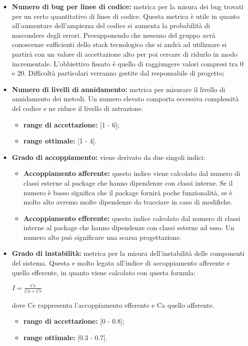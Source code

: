 \begin{itemize}
				\item \textbf{Numero di bug per linee di codice:} metrica per la misura dei bug trovati per un certo quantitativo di linee di codice. Questa metrica è utile in quanto all'aumentare dell'ampiezza del codice si aumenta la probabilità di nascondere degli errori. Presupponendo che nessuno del gruppo avrà conoscenze sufficienti dello stack tecnologico che si andrà ad utilizzare si partirà con un valore di accettazione alto per poi cercare di ridurlo in modo incrementale. L'obbiettivo fissato è quello di raggiungere valori compresi tra 0 e 20. Difficoltà particolari verranno gestite dal responsabile di progetto;
				\item \textbf{Numero di livelli di annidamento:} metrica per misurare il livello di annidamento dei metodi. Un numero elevato comporta eccessiva complessità del codice e ne riduce il livello di astrazione.
				\begin{itemize}
					\item \textbf{range di accettazione:} [1 - 6];
					\item \textbf{range ottimale:} [1 - 4].
				\end{itemize}
				
				\item \textbf{Grado di accoppiamento:} viene derivato da due singoli indici:
				\begin{itemize}
					\item \textbf{Accoppiamento afferente:} questo indice viene calcolato dal numero di classi esterne al package che hanno dipendenze con classi interne. Se il numero è basso significa che il package fornirà poche funzionalità, se è molto alto avremo molte dipendenze da tracciare in caso di modifiche.
					\item \textbf{Accoppiamento efferente:} questo indice calcolato dal numero di classi interne al package che hanno dipendenze con classi esterne ad esso. Un numero alto può significare una scarsa progettazione.
				\end{itemize}
				
				\item \textbf{Grado di instabilità:} metrica per la misura dell'instabilità delle componenti del sistema. Questa e molto legata all'indice di accoppiamento afferente e quello efferente, in quanto viene calcolato con questa formula:\\
				\begin{center}
					\begin{math}
						I=\frac{Ce}{Ca+Ce}
					\end{math}
				\end{center}		
				dove Ce rappresenta l'accoppiamento efferente e Ca quello afferente.
				\begin{itemize}
					\item \textbf{range di accettazione:} [0 - 0.8];
					\item \textbf{range ottimale:} [0.3 - 0.7].
				\end{itemize}
				

\end{itemize}
